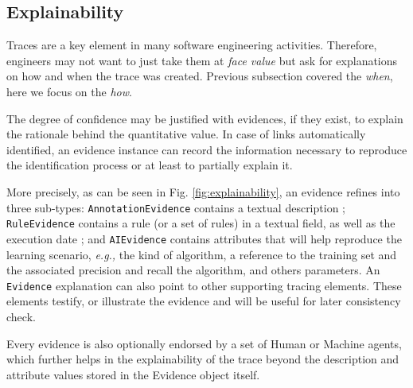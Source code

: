 
\subsection{Explainability}
Traces are a key element in many software engineering activities. Therefore, engineers may not want to just take them at \textit{face value} but ask for explanations on how and when the trace was created. Previous subsection covered the \textit{when}, here we focus on the \textit{how}.

The degree of confidence may be justified with evidences, if they exist, to explain the rationale behind the quantitative value. In case of links automatically identified, an evidence instance can record the information necessary to reproduce the identification process or at least to partially explain it. 

More precisely, as can be seen in Fig. \ref{fig:explainability}, an evidence refines into three sub-types: \texttt{AnnotationEvidence} contains a textual description ; \texttt{RuleEvidence} contains a rule (or a set of rules) in a textual field, as well as the execution date ; and \texttt{AIEvidence} contains attributes that will help reproduce the learning scenario, \textit{e.g.,} the kind of algorithm, a reference to the training set and the associated precision and recall the algorithm, and others parameters. An \texttt{Evidence} explanation can also point to other supporting tracing elements. These elements testify, or illustrate the evidence and will be useful for later consistency check.

Every evidence is also optionally endorsed by a set of Human or Machine agents, which further helps in the explainability of the trace beyond the description and attribute values stored in the Evidence object itself.



